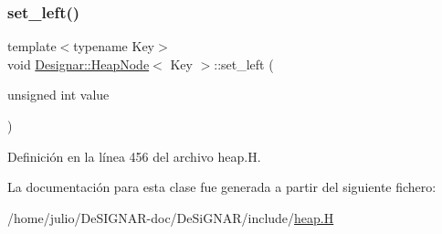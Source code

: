 \subsubsection{\texorpdfstring{set\+\_\+left()}{set\_left()}}
{\footnotesize\ttfamily template$<$typename Key$>$ \\
void \hyperlink{class_designar_1_1_heap_node}{Designar\+::\+Heap\+Node}$<$ Key $>$\+::set\+\_\+left (\begin{DoxyParamCaption}\item[{unsigned int}]{value }\end{DoxyParamCaption})\hspace{0.3cm}{\ttfamily [inline]}}



Definición en la línea 456 del archivo heap.\+H.



La documentación para esta clase fue generada a partir del siguiente fichero\+:\begin{DoxyCompactItemize}
\item 
/home/julio/\+De\+S\+I\+G\+N\+A\+R-\/doc/\+De\+Si\+G\+N\+A\+R/include/\hyperlink{heap_8_h}{heap.\+H}\end{DoxyCompactItemize}
